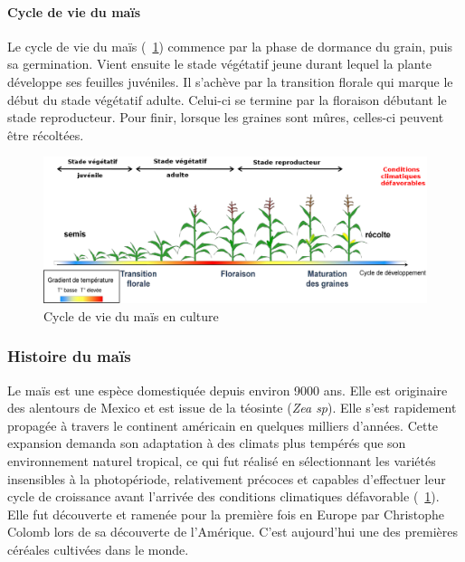 \documentclass[12pt,a4paper]{article}
\begin{document}
						\paragraph{Cycle de vie du maïs}
						Le cycle de vie du maïs (~\ref{Cycle de vie du maïs en culture}) commence par la phase de dormance du grain, puis sa germination. Vient ensuite le stade végétatif jeune durant lequel la plante développe ses feuilles juvéniles. Il s'achève par la transition florale qui marque le début du stade végétatif adulte. Celui-ci se termine par la floraison débutant le stade reproducteur. Pour finir, lorsque les graines sont mûres, celles-ci peuvent être récoltées.
						\begin{figure}[h]
							\centering
							\includegraphics[width=13.7cm]{cycle.png}
							\caption{Cycle de vie du maïs en culture}
							\label{Cycle de vie du maïs en culture}
						\end{figure}
							
					
					\subsubsection{Histoire du maïs}
						Le maïs est une espèce domestiquée depuis environ 9000 ans. Elle est originaire des alentours de Mexico et est issue de la téosinte (\textit{Zea sp}). Elle s'est rapidement propagée à travers le continent américain\cite{tenaillon} en quelques milliers d'années. Cette expansion demanda son adaptation à des climats plus tempérés que son environnement naturel tropical, ce qui fut réalisé en sélectionnant les variétés insensibles à la photopériode, relativement précoces et capables d'effectuer leur cycle de croissance avant l'arrivée des conditions climatiques défavorable (~\ref{Cycle de vie du maïs en culture}). Elle fut découverte et ramenée pour la première fois en Europe par Christophe Colomb lors de sa découverte de l'Amérique. C'est aujourd'hui une des premières céréales cultivées dans le monde.
						
\end{document}
